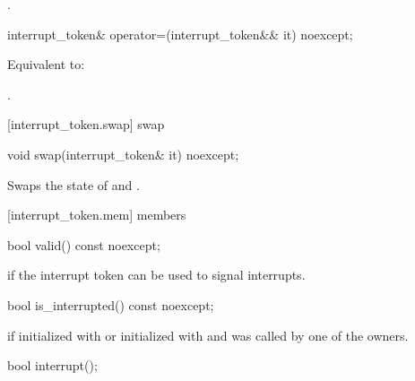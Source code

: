 {\begin{itemdescr}
  \pnum\returns {}.
\end{itemdescr}

%
\begin{itemdecl}
interrupt_token& operator=(interrupt_token&& it) noexcept;
\end{itemdecl}
\begin{itemdescr}
  \pnum\effects Equivalent to: 

  \pnum\returns {}.
\end{itemdescr}

[interrupt_token.swap]{ swap}

%
\begin{itemdecl}
void swap(interrupt_token& it) noexcept;
\end{itemdecl}

\begin{itemdescr}
\pnum
\effects Swaps the state of  and .
\end{itemdescr}


[interrupt_token.mem]{ members}

%
\begin{itemdecl}
bool valid() const noexcept;
\end{itemdecl}
\begin{itemdescr}
  \pnum\returns {} if the interrupt token can be used to signal interrupts.
\end{itemdescr}

%
\begin{itemdecl}
bool is_interrupted() const noexcept;
\end{itemdecl}
\begin{itemdescr}
  \pnum\returns {} if initialized with 
                or initialized with  and  was called
                by one of the owners.
\end{itemdescr}

%
\begin{itemdecl}
bool interrupt();
\end{itemdecl}
\begin{itemdescr}
  \pnum\requires {}


\end{itemdescr}}
